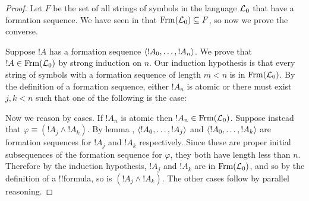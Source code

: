 \documentclass[../../../include/open-logic-section]{subfiles}
\begin{document}
\begin{proof}
Let $F$ be the set of all strings of symbols in the language
$\Lang L_0$ that have a formation sequence. We have seen in
 that $\Frm[L_0] \subseteq F$,
so now we prove the converse.

Suppose $!A$ has a formation sequence $\langle !A_0,\dotsc,!A_n \rangle$.
We prove that $!A \in \Frm[L_0]$ by strong induction on $n$.
Our induction hypothesis is that every string of symbols with a
formation sequence of length $m < n$ is in $\Frm[L_0]$.
By the definition of a formation sequence, either $!A_n$ is
atomic or there must exist $j,k < n$ such that one of the
following is the case:
\begin{enumerate}
\end{enumerate}
Now we reason by cases. If $!A_n$ is atomic then
$!A_n \in \Frm[L_0]$. Suppose instead that $\varphi \equiv
(!A_j \land !A_k)$. By lemma ,
$\langle !A_0,\dotsc,!A_j \rangle$ and $\langle !A_0,\dotsc,!A_k \rangle$ are
formation sequences for $!A_j$ and $!A_k$ respectively. Since
these are proper initial subsequences of the formation sequence
for $\varphi$, they both have length less than $n$. Therefore by
the induction hypothesis, $!A_j$ and $!A_k$ are in $\Frm[L_0]$,
and so by the definition of a !!{formula}, so is
$(!A_j \land !A_k)$. The other cases follow by parallel
reasoning.
\end{proof}
\end{document}
